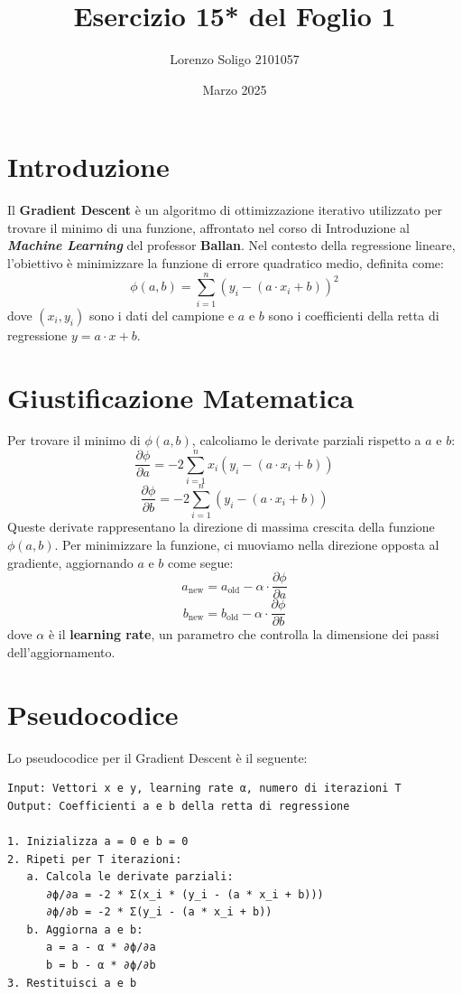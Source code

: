 \documentclass{article}
\title{Esercizio 15* del Foglio 1}
\author{Lorenzo Soligo 2101057}
\date{Marzo 2025}
\begin{document}
\maketitle

\section{Introduzione}
Il \textbf{Gradient Descent} è un algoritmo di ottimizzazione iterativo utilizzato per trovare il minimo di una funzione, affrontato nel corso di Introduzione al \textbf{\textit{Machine Learning}} del professor \textbf{Ballan}. Nel contesto della regressione lineare, l'obiettivo è minimizzare la funzione di errore quadratico medio, definita come:
\[
\phi(a, b) = \sum_{i=1}^n (y_i - (a \cdot x_i + b))^2
\]
dove \((x_i, y_i)\) sono i dati del campione e \(a\) e \(b\) sono i coefficienti della retta di regressione \(y = a \cdot x + b\).

\section{Giustificazione Matematica}
Per trovare il minimo di \(\phi(a, b)\), calcoliamo le derivate parziali rispetto a \(a\) e \(b\):
\[
\frac{\partial \phi}{\partial a} = -2 \sum_{i=1}^n x_i (y_i - (a \cdot x_i + b))
\]
\[
\frac{\partial \phi}{\partial b} = -2 \sum_{i=1}^n (y_i - (a \cdot x_i + b))
\]
Queste derivate rappresentano la direzione di massima crescita della funzione \(\phi(a, b)\). Per minimizzare la funzione, ci muoviamo nella direzione opposta al gradiente, aggiornando \(a\) e \(b\) come segue:
\[
a_{\text{new}} = a_{\text{old}} - \alpha \cdot \frac{\partial \phi}{\partial a}
\]
\[
b_{\text{new}} = b_{\text{old}} - \alpha \cdot \frac{\partial \phi}{\partial b}
\]
dove \(\alpha\) è il \textbf{learning rate}, un parametro che controlla la dimensione dei passi dell'aggiornamento.

\section{Pseudocodice}
Lo pseudocodice per il Gradient Descent è il seguente:

\begin{verbatim}
Input: Vettori x e y, learning rate α, numero di iterazioni T
Output: Coefficienti a e b della retta di regressione

1. Inizializza a = 0 e b = 0
2. Ripeti per T iterazioni:
   a. Calcola le derivate parziali:
      ∂ϕ/∂a = -2 * Σ(x_i * (y_i - (a * x_i + b)))
      ∂ϕ/∂b = -2 * Σ(y_i - (a * x_i + b))
   b. Aggiorna a e b:
      a = a - α * ∂ϕ/∂a
      b = b - α * ∂ϕ/∂b
3. Restituisci a e b
\end{verbatim}
\end{document}
